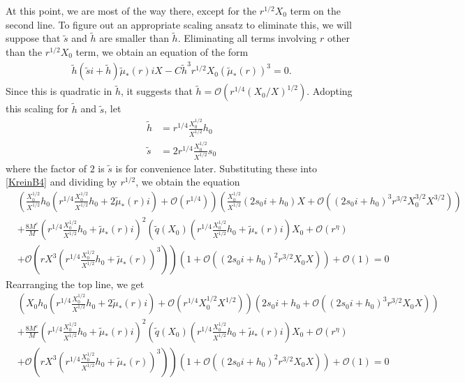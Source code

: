 \documentclass[thesis.tex]{subfiles}
\begin{document}
At this point, we are most of the way there, except for the $r^{1/2}X_0$ term on the second line. To figure out an appropriate scaling ansatz to eliminate this, we will suppose that $\tilde{s}$ and $\tilde{h}$ are smaller than $\tilde{h}$. Eliminating all terms involving $r$ other than the $r^{1/2}X_0$ term, we obtain an equation of the form
\begin{equation*}
\begin{aligned}
\tilde{h} (\tilde{s}i + \tilde{h}) \tilde{\mu}_*(r) i X
- C \tilde{h}^3 r^{1/2} X_0 (\tilde{\mu}_*(r))^3 = 0.
\end{aligned}
\end{equation*} 
Since this is quadratic in $\tilde{h}$, it suggests that $\tilde{h} = \mathcal{O}(r^{1/4}(X_0/X)^{1/2})$. Adopting this scaling for $\tilde{h}$ and $\tilde{s}$, let
\begin{align*}
\tilde{h} &= r^{1/4}\frac{X_0^{1/2}}{X^{1/2}} h_0 \\
\tilde{s} &= 2 r^{1/4}\frac{X_0^{1/2}}{X^{1/2}} s_0
\end{align*}
where the factor of $2$ is $\tilde{s}$ is for convenience later. Substituting these into \cref{KreinB4} and dividing by $r^{1/2}$, we obtain the equation
\begin{equation}\label{KreinB5}
\begin{aligned}
&\left( \frac{X_0^{1/2}}{X^{1/2}} h_0 \left( r^{1/4}\frac{X_0^{1/2}}{X^{1/2}} h_0 + 2 \tilde{\mu}_*(r) i\right) + \mathcal{O}( r^{1/4} ) \right) 
\left( \frac{X_0^{1/2}}{X^{1/2}}(2 s_0 i + h_0) X + \mathcal{O}\left( \left( 2 s_0 i + h_0 \right)^3 r^{3/2} X_0^{3/2} X^{3/2} \right) \right) \\
&+\frac{8 M^c}{M} \left( r^{1/4}\frac{X_0^{1/2}}{X^{1/2}} h_0 + \tilde{\mu}_*(r) i\right)^2 \left( \tilde{q}(X_0) \left(r^{1/4}\frac{X_0^{1/2}}{X^{1/2}} h_0 + \tilde{\mu}_*(r)i \right) X_0 + \mathcal{O}(r^{\eta}) \right.\\
&+ \left. \mathcal{O} \left (r X^3 \left(r^{1/4} \frac{X_0^{1/2}}{X^{1/2}} h_0 + \tilde{\mu}_*(r)\right)^3 \right) \right) \left( 1 + \mathcal{O}\left( \left(2 s_0 i + h_0\right)^2 r^{3/2} X_0 X \right) \right) + \mathcal{O}(1) = 0
\end{aligned}
\end{equation}
Rearranging the top line, we get
\begin{equation*}
\begin{aligned}
&\left( X_0 h_0 \left( r^{1/4}\frac{X_0^{1/2}}{X^{1/2}} h_0 + 2 \tilde{\mu}_*(r) i\right) + \mathcal{O}\left( r^{1/4} X_0^{1/2} X^{1/2} \right) \right) 
\left( 2 s_0 i + h_0 + \mathcal{O}\left( \left( 2 s_0 i + h_0 \right)^3 r^{3/2} X_0 X \right) \right) \\
&+\frac{8 M^c}{M} \left( r^{1/4}\frac{X_0^{1/2}}{X^{1/2}} h_0 + \tilde{\mu}_*(r) i\right)^2 \left( \tilde{q}(X_0) \left(r^{1/4}\frac{X_0^{1/2}}{X^{1/2}} h_0 + \tilde{\mu}_*(r)i \right) X_0 + \mathcal{O}(r^{\eta}) \right.\\
&+ \left. \mathcal{O} \left (r X^3 \left(r^{1/4} \frac{X_0^{1/2}}{X^{1/2}} h_0 + \tilde{\mu}_*(r)\right)^3 \right) \right) \left( 1 + \mathcal{O}\left( \left(2 s_0 i + h_0\right)^2 r^{3/2} X_0 X \right) \right) + \mathcal{O}(1) = 0
\end{aligned}
\end{equation*}
\end{document}
